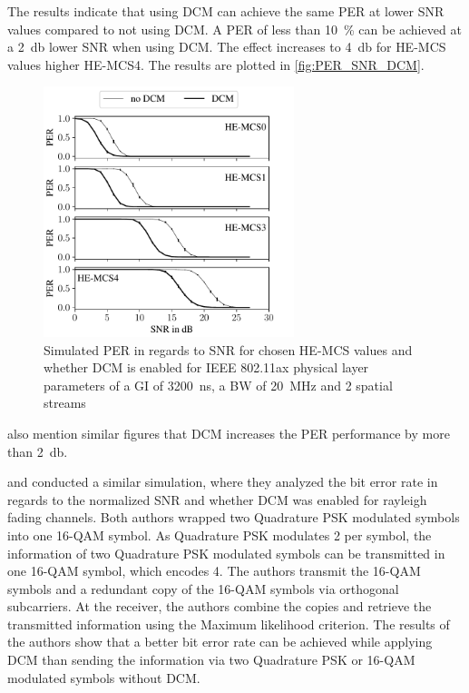The results indicate that using \ac{DCM} can achieve the same \ac{PER} at lower \ac{SNR} values compared to not using \ac{DCM}. A \ac{PER} of less than \SI{10}{\percent} can be achieved at
a \SI{2}{\decibel} lower \ac{SNR} when using \ac{DCM}.
The effect increases to \SI{4}{\decibel} for \ac{HE}-\ac{MCS} values higher \ac{HE}-\ac{MCS}\num{4}.
The results are plotted in \autoref{fig:PER_SNR_DCM}.
\begin{figure}[H]%
   \centering
   \includegraphics[width=0.65\textwidth]{figures/DCM_PER_to_SNR.pdf}
   \caption{Simulated \ac{PER} in regards to \ac{SNR} for chosen \ac{HE}-\ac{MCS} values and whether \acf{DCM} is enabled for IEEE 802.11ax physical layer parameters of a \ac{GI} of \SI{3200}{\nano\second}, a \ac{BW} of \SI{20}{\mega\hertz} and 2 spatial streams}%
   \label{fig:PER_SNR_DCM}%
\end{figure}

\textcite{khorov_ieee_2015} also mention similar figures that \ac{DCM} increases the \ac{PER} performance by more than \SI{2}{\decibel}.

\textcite{ryu_ber_2010} and \textcite{park_ber_2006} conducted a similar simulation, where they analyzed the bit error rate in
regards to the normalized \ac{SNR} and whether \ac{DCM} was enabled for rayleigh fading channels.
Both authors wrapped two Quadrature \ac{PSK} modulated symbols into one 16-\ac{QAM} symbol.
As Quadrature \ac{PSK} modulates \SI{2}{\bit} per symbol, the information of two Quadrature \ac{PSK} modulated symbols can be
transmitted in one 16-\ac{QAM} symbol, which encodes \SI{4}{\bit}.
The authors transmit the 16-\ac{QAM} symbols and a redundant copy
of the 16-\ac{QAM} symbols via orthogonal subcarriers.
At the receiver, the authors combine the copies and retrieve the transmitted
information using the Maximum likelihood criterion.
The results of the authors show that a better bit error rate can be achieved while applying
\ac{DCM} than sending the information via two Quadrature \ac{PSK} or 16-\ac{QAM} modulated symbols without \ac{DCM}.

